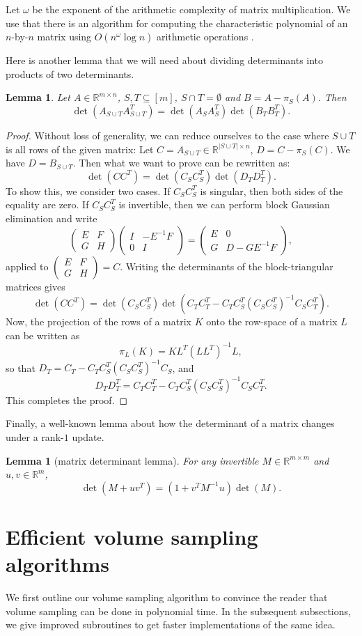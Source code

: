 \documentclass[11pt]{article}
\newcommand{\RR}{\mathbb{R}}
\newcommand{\rowmatrix}[4]{
\begin{pmatrix}
#1 & #2 \\
#3 & #4
\end{pmatrix}
}
\newcommand{\card}[1]{\lvert{#1}\rvert}
\newtheorem{lemma}[theorem]{Lemma}
\def\reals{\mathbb{R}}
\newcommand{\deter}[1]{\operatorname{det}\left(#1\right)}
\begin{document}
Let $\omega$ be the exponent of the arithmetic complexity of matrix multiplication. We use that there is an algorithm for computing the characteristic polynomial of an $n$-by-$n$ matrix using $O(n^\omega \log n)$ arithmetic operations \cite[Section 16.6]{ACT}.

Here is another lemma that we will need about dividing determinants into products of two determinants.
\begin{lemma} \label{lemma:det-division}
Let $A \in \reals^{m \times n}$, $S, T \subseteq [m]$, $S \cap T = \emptyset$ and $B = A - \pi_{S}(A)$. Then
\[
\deter{A_{S \cup T} A_{S \cup T}^{T}} = \deter{A_{S} A_{S}^{T}} \deter{B_{T} B_{T}^{T}}.
\]
\end{lemma}
\begin{proof}
Without loss of generality, we can reduce ourselves to the case where $S \cup T$ is all rows of the given matrix: Let $C= A_{S \cup T} \in \RR^{\card{S \cup T} \times n}$,  $D = C -\pi_{S}(C)$. We have $D = B_{S \cup T}$. Then what we want to prove can be rewritten as:
\[
\det (C C^T) = \det(C_{S} C_{S}^T) \det(D_T D_T^T).
\]
To show this, we consider two cases. If $C_S C_S^T$ is singular, then both sides of the equality are zero. If $C_S C_S^T$ is invertible, then we can perform block Gaussian elimination and write
\[
\rowmatrix{E}{F}{G}{H} \rowmatrix{I}{-E^{-1} F}{0}{I}
= \rowmatrix{E}{0}{G}{D-G E^{-1}F},
\]
applied to $\rowmatrix{E}{F}{G}{H}= C$. Writing the determinants of the block-triangular matrices gives
\[
\det (C C^T) = \det (C_S C_S^T) \det (C_T C_T^T - C_T C_S^T(C_S C_S^T)^{-1} C_S C_T^T).
\]
Now, the projection of the rows of a matrix $K$ onto the row-space of a matrix $L$ can be written as
\[
\pi_{L}(K) = K L^T (L L^T)^{-1} L,
\]
so that $D_T = C_T - C_T C_S^T (C_S C_S^T)^{-1} C_S$,  and
\[
D_T D_T^T = C_T C_T^T - C_T C_S^T(C_S C_S^T)^{-1} C_S C_T^T.
\]
This completes the proof.
\end{proof}

Finally, a well-known lemma about how the determinant of a matrix changes under a rank-$1$ update.
\begin{lemma}[matrix determinant lemma] \label{lemma:matrix-det}
For any invertible $M \in \reals^{m \times m}$ and $u, v \in \reals^{m}$,
\[
\deter{M + uv^{T}} = (1 + v^{T}M^{-1}u) \deter{M}.
\]
\end{lemma}



\section{Efficient volume sampling algorithms} \label{sec:algo-outline}
We first outline our volume sampling algorithm to convince the reader that volume sampling can be done in polynomial time. In the subsequent subsections, we give improved subroutines to get faster implementations of the same idea.
\end{document}
